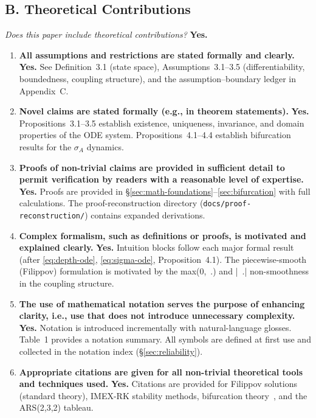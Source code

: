 \documentclass[10pt]{article}
\begin{document}
\subsection*{B. Theoretical Contributions}
\noindent\textit{Does this paper include theoretical contributions?} \textbf{Yes.}

\begin{enumerate}
  \item \textbf{All assumptions and restrictions are stated formally and clearly.}
    \textbf{Yes.} See Definition~3.1 (state space), Assumptions~3.1--3.5
    (differentiability, boundedness, coupling structure), and the
    assumption--boundary ledger in Appendix~C.

  \item \textbf{Novel claims are stated formally (e.g., in theorem statements).}
    \textbf{Yes.} Propositions~3.1--3.5 establish existence, uniqueness,
    invariance, and domain properties of the ODE system.
    Propositions~4.1--4.4 establish bifurcation results for the
    $\sigma_A$ dynamics.

  \item \textbf{Proofs of non-trivial claims are provided in sufficient detail to
    permit verification by readers with a reasonable level of expertise.}
    \textbf{Yes.} Proofs are provided in \S\ref{sec:math-foundations}--\ref{sec:bifurcation}
    with full calculations. The proof-reconstruction directory
    (\texttt{docs/proof-reconstruction/}) contains expanded derivations.

  \item \textbf{Complex formalism, such as definitions or proofs, is motivated and
    explained clearly.}
    \textbf{Yes.} Intuition blocks follow each major formal result (after
    \eqref{eq:depth-ode}, \eqref{eq:sigma-ode}, Proposition~4.1).
    The piecewise-smooth (Filippov) formulation is motivated by the
    max(0,~.) and |~.| non-smoothness in the coupling structure.

  \item \textbf{The use of mathematical notation serves the purpose of enhancing
    clarity, i.e., use that does not introduce unnecessary complexity.}
    \textbf{Yes.} Notation is introduced incrementally with natural-language
    glosses. Table~1 provides a notation summary. All symbols are defined
    at first use and collected in the notation index (\S\ref{sec:reliability}).

  \item \textbf{Appropriate citations are given for all non-trivial theoretical tools
    and techniques used.}
    \textbf{Yes.} Citations are provided for Filippov solutions
    (standard theory), IMEX-RK stability methods, bifurcation
    theory~\cite{kuznetsov1998}, and the ARS(2,3,2) tableau.
\end{enumerate}
\end{document}
